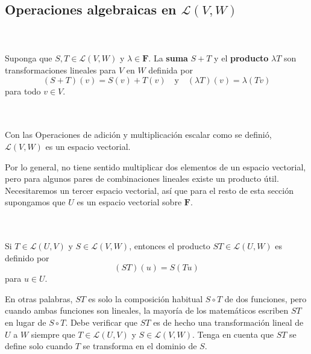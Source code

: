 \vspace{.5cm}

\subsection*{Operaciones algebraicas en \boldmath $\mathcal{L}(V,W)$}

\setcounter{mydef}{5}
\begin{mydef}\,\\\\
    Suponga que $S,T\in \mathcal{L}(V,W)$ y $\lambda \in \textbf{F}$. La \textbf{suma} $S+T$ y el \textbf{producto} $\lambda T$ son transformaciones lineales para $V$ en $W$ definida por
    $$(S+T)(v)=S(v)+T(v) \quad \mbox{y} \quad (\lambda T)(v)=\lambda(Tv)$$
    para todo $v\in V$.
\end{mydef}

\begin{myteo}\,\\\\
    Con las Operaciones de adición y multiplicación escalar como se definió, $\mathcal{L}\left(V,W\right)$ es un espacio vectorial.
\end{myteo}

Por lo general, no tiene sentido multiplicar dos elementos de un espacio vectorial, pero para algunos pares de combinaciones lineales existe un producto útil. Necesitaremos un tercer espacio vectorial, así que para el resto de esta sección supongamos que $U$ es un espacio vectorial sobre $\textbf{F}$.

\begin{mydef}\,\\\\
    Si $T\in \mathcal{L}(U,V)$ y $S\in \mathcal{L}(V,W)$, entonces el producto $ST\in \mathcal{L}(U,W)$ es definido por
    $$(ST)(u)=S(Tu)$$
    para $u\in U$.
\end{mydef}

En otras palabras, $ST$ es solo la composición habitual $S\circ T$ de dos funciones, pero cuando ambas funciones son lineales, la mayoría de los matemáticos escriben $ST$ en lugar de $S\circ T$. Debe verificar que $ST$ es de hecho una transformación lineal de $U$ a $W$ siempre que $T\in \mathcal{L}(U,V)$ y $S\in \mathcal{L}(V,W)$. Tenga en cuenta que $ST$ se define solo cuando $T$ se transforma en el dominio de $S$.

